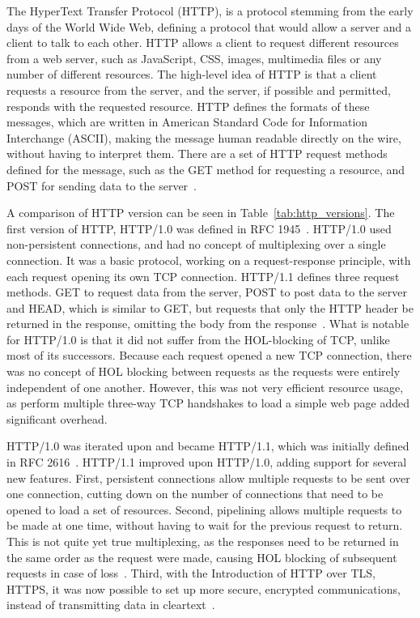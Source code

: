 \documentclass[english, 12pt, a4paper, elec, utf8, a-2b, online]{aaltothesis}
\begin{document}
The HyperText Transfer Protocol (HTTP), is a protocol stemming from the early days 
of the World Wide Web, defining a protocol that would allow a server and a client
to talk to each other. HTTP allows a client to request different resources from a 
web server, such as JavaScript, CSS, images, multimedia files or any number of different resources.
The high-level idea of HTTP is that a client requests a resource from the server,
and the server, if possible and permitted, responds with the requested resource.
HTTP defines the formats of these messages, which are written in American Standard Code for Information Interchange (ASCII),
making the message human readable directly on the wire, without having to interpret 
them. There are a set of HTTP request methods defined for the message, such as
the GET method for requesting a resource, and POST for sending data to the server~\cite{compute_rnetworking}.

A comparison of HTTP version can be seen in Table~\ref{tab:http_versions}. 
The first version of HTTP, HTTP/1.0 was defined in RFC 1945~\cite{rfc1945}. HTTP/1.0
used non-persistent connections, and had no concept of multiplexing over a single connection.
It was a basic protocol, working on a request-response principle, with each request opening
its own TCP connection. HTTP/1.1 defines three request methods. GET to request data
from the server, POST to post data to the server and HEAD, which is similar to GET,
but requests that only the HTTP header be returned in the response, omitting the
body from the response~\cite{rfc1945}. What is notable for HTTP/1.0 is that it
did not suffer from the HOL-blocking of TCP, unlike most of its successors. Because each
request opened a new TCP connection, there was no concept of HOL blocking between requests as the
requests were entirely independent of one another. However, this was not very efficient
resource usage, as perform multiple three-way TCP handshakes to load a simple web page
added significant overhead.

HTTP/1.0 was iterated upon and became HTTP/1.1, which was initially defined in
RFC 2616~\cite{rfc2616}. HTTP/1.1 improved upon HTTP/1.0, adding support for several
new features. First, persistent connections allow multiple requests to be sent over one connection,
cutting down on the number of connections that need to be opened to load a set of resources.
Second, pipelining allows multiple requests to be made at one time, without having to wait for the
previous request to return. This is not quite yet true multiplexing, as the responses
need to be returned in the same order as the request were made, causing HOL blocking
of subsequent requests in case of loss~\cite{rfc2616}. Third, with the Introduction
of HTTP over TLS, HTTPS, it was now possible to set up more secure, encrypted communications,
instead of transmitting data in cleartext~\cite{rfc2818}.
\end{document}
